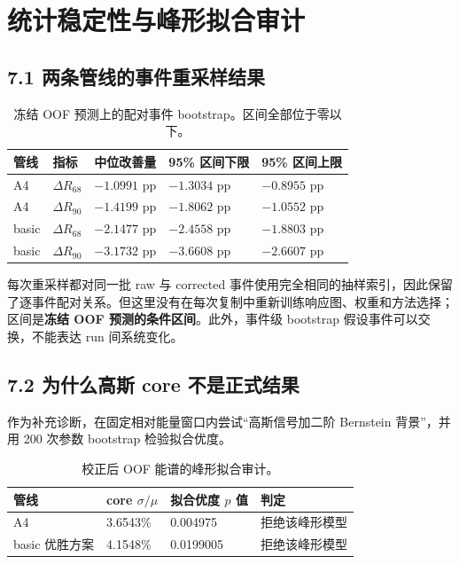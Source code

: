 \documentclass[UTF8,11pt,a4paper,oneside,fontset=none]{ctexart}
\newcommand{\Rsixtyeight}{R_{68}}
\newcommand{\Rninty}{R_{90}}
\newcommand{\bad}{\cellcolor{SoftRed}}
\begin{document}
\section{统计稳定性与峰形拟合审计}

\subsection*{7.1 两条管线的事件重采样结果}

\begin{table}[H]
\centering
\small
\caption{冻结 OOF 预测上的配对事件 bootstrap。区间全部位于零以下。}
\begin{tabular}{@{}C{3.1cm} C{2.2cm} C{2.6cm} C{3.0cm} C{3.0cm}@{}}
\toprule
管线 & 指标 & 中位改善量 & 95\% 区间下限 & 95\% 区间上限\\
\midrule
A4 & \(\Delta\Rsixtyeight\) & $-1.0991$ pp & $-1.3034$ pp & $-0.8955$ pp\\
A4 & \(\Delta\Rninty\) & $-1.4199$ pp & $-1.8062$ pp & $-1.0552$ pp\\
basic & \(\Delta\Rsixtyeight\) & $-2.1477$ pp & $-2.4558$ pp & $-1.8803$ pp\\
basic & \(\Delta\Rninty\) & $-3.1732$ pp & $-3.6608$ pp & $-2.6607$ pp\\
\bottomrule
\end{tabular}
\end{table}

\begin{warningbox}[title={bootstrap 区间的准确含义},fonttitle=\bfseries]
每次重采样都对同一批 raw 与 corrected 事件使用完全相同的抽样索引，因此保留了逐事件配对关系。但这里没有在每次复制中重新训练响应图、权重和方法选择；区间是\textbf{冻结 OOF 预测的条件区间}。此外，事件级 bootstrap 假设事件可以交换，不能表达 run 间系统变化。
\end{warningbox}

\subsection*{7.2 为什么高斯 core 不是正式结果}

作为补充诊断，在固定相对能量窗口内尝试“高斯信号加二阶 Bernstein 背景”，并用 200 次参数 bootstrap 检验拟合优度。

\begin{table}[H]
\centering
\small
\caption{校正后 OOF 能谱的峰形拟合审计。}
\begin{tabular}{@{}C{3.5cm} C{3.4cm} C{3.0cm} C{4.2cm}@{}}
\toprule
管线 & core \(\sigma/\mu\) & 拟合优度 $p$ 值 & 判定\\
\midrule
A4 & 3.6543\% & 0.004975 & \bad 拒绝该峰形模型\\
basic 优胜方案 & 4.1548\% & 0.0199005 & \bad 拒绝该峰形模型\\
\bottomrule
\end{tabular}
\end{table}
\end{document}
